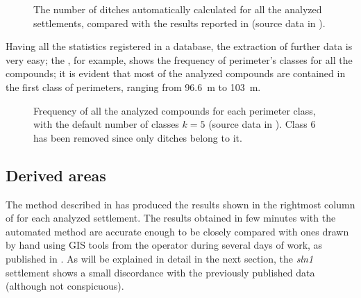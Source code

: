             \begin{figure}[H]
                \centering
                \begin{tikzpicture}
                    
                \end{tikzpicture}
                \caption[The number of ditches in \cite{laterza} compared to the results of the proposed method]{The number of ditches automatically calculated for all the analyzed settlements, compared with the results reported in \cite{laterza} (source data in ).}
                \label{fig:graph-num-ditch}
            \end{figure}

            Having all the statistics registered in a database, the extraction of further data is very easy; the , for example, shows the frequency of perimeter's classes for all the compounds; it is evident that most of the analyzed compounds are contained in the first class of perimeters, ranging from \SI{96.6}{\meter} to \SI{103}{\meter}.

            \begin{figure}
                \caption[Frequency of all the analyzed compounds for each perimeter class, with $k=5$]{Frequency of all the analyzed compounds for each perimeter class, with the default number of classes $k=5$ (source data in ). Class $6$ has been removed since only ditches belong to it.}
                \begin{tikzpicture}
                    
                \end{tikzpicture}
                \label{fig:graph-perim-class}
            \end{figure}

        \subsection{Derived areas\label{sec:derived-areas}}

            The method described in  has produced the results shown in the rightmost column of  for each analyzed settlement. The results obtained in few minutes with the automated method are accurate enough to be closely compared with ones drawn by hand using GIS tools from the operator during several days of work, as published in \cite{laterza}.
            As will be explained in detail in the next section, the \emph{sln1} settlement shows a small discordance with the previously published data (although not conspicuous).

